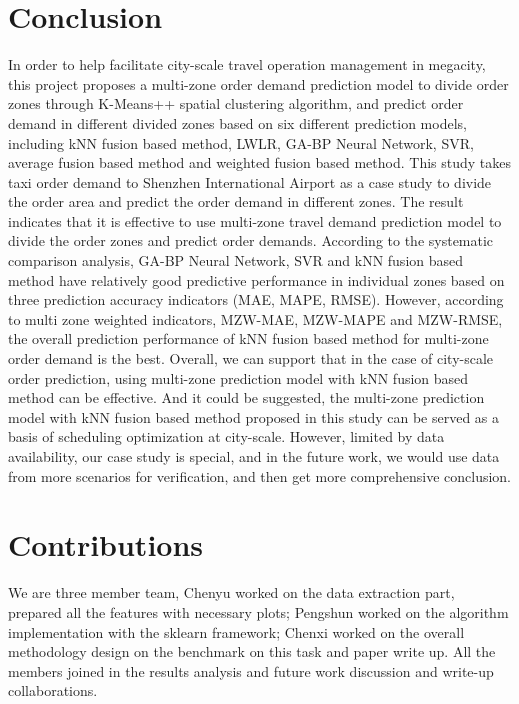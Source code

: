 \documentclass[sigconf]{acmart}
\begin{document}
\section{Conclusion}
In order to help facilitate city-scale travel operation management in megacity,
this project proposes a multi-zone order demand prediction model to divide order
zones through K-Means++ spatial clustering algorithm, and predict order demand
in different divided zones based on six different prediction models, including
kNN fusion based method, LWLR, GA-BP Neural Network, SVR, average fusion based
method and weighted fusion based method. This study takes taxi order demand to
Shenzhen International Airport as a case study to divide the order area and predict
the order demand in different zones. The result indicates that it is effective
to use multi-zone travel demand prediction model to divide the order zones and
predict order demands. According to the systematic comparison analysis, GA-BP
Neural Network, SVR and kNN fusion based method have relatively good predictive
performance in individual zones based on three prediction accuracy indicators (MAE, MAPE, RMSE). 
However, according to multi zone weighted indicators, MZW-MAE, MZW-MAPE and MZW-RMSE,
the overall prediction performance of kNN fusion based method for multi-zone order demand is the best.
Overall, we can support that in the case of city-scale order prediction,
using multi-zone prediction model with kNN fusion based method can be effective.
And it could be suggested, the multi-zone prediction model with kNN fusion based method
proposed in this study can be served as a basis of scheduling optimization at city-scale.
However, limited by data availability, our case study is special, and in the future work,
we would use data from more scenarios for verification, and then get more comprehensive
conclusion.


\section{Contributions}
We are three member team, Chenyu worked on the data
extraction part, prepared all the features with necessary
plots; Pengshun worked on the algorithm implementation with the sklearn framework;
Chenxi worked on the overall methodology
design on the benchmark on this task and paper
write up. All the members joined in the results analysis
and future work discussion and write-up collaborations.



\end{document}
